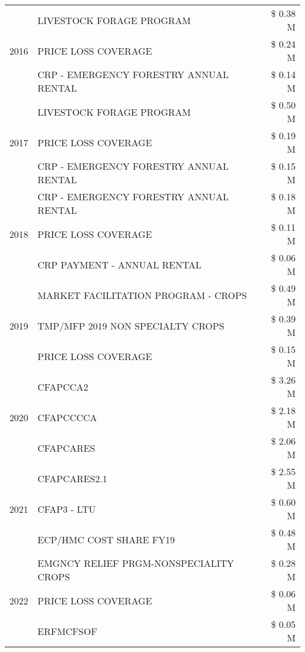 \begin{tabular}{llr}
\cline{1-3}
\multirow[t]{3}{*}{2016} & LIVESTOCK FORAGE PROGRAM & \$ 0.38 M \\
 & PRICE LOSS COVERAGE & \$ 0.24 M \\
 & CRP - EMERGENCY FORESTRY ANNUAL RENTAL & \$ 0.14 M \\
\cline{1-3}
\multirow[t]{3}{*}{2017} & LIVESTOCK FORAGE PROGRAM & \$ 0.50 M \\
 & PRICE LOSS COVERAGE & \$ 0.19 M \\
 & CRP - EMERGENCY FORESTRY ANNUAL RENTAL & \$ 0.15 M \\
\cline{1-3}
\multirow[t]{3}{*}{2018} & CRP - EMERGENCY FORESTRY ANNUAL RENTAL & \$ 0.18 M \\
 & PRICE LOSS COVERAGE & \$ 0.11 M \\
 & CRP PAYMENT - ANNUAL RENTAL & \$ 0.06 M \\
\cline{1-3}
\multirow[t]{3}{*}{2019} & MARKET FACILITATION PROGRAM - CROPS & \$ 0.49 M \\
 & TMP/MFP 2019 NON SPECIALTY CROPS & \$ 0.39 M \\
 & PRICE LOSS COVERAGE & \$ 0.15 M \\
\cline{1-3}
\multirow[t]{3}{*}{2020} & CFAPCCA2 & \$ 3.26 M \\
 & CFAPCCCCA & \$ 2.18 M \\
 & CFAPCARES & \$ 2.06 M \\
\cline{1-3}
\multirow[t]{3}{*}{2021} & CFAPCARES2.1 & \$ 2.55 M \\
 & CFAP3 - LTU & \$ 0.60 M \\
 & ECP/HMC COST SHARE FY19 & \$ 0.48 M \\
\cline{1-3}
\multirow[t]{3}{*}{2022} & EMGNCY RELIEF PRGM-NONSPECIALITY CROPS & \$ 0.28 M \\
 & PRICE LOSS COVERAGE & \$ 0.06 M \\
 & ERFMCFSOF & \$ 0.05 M \\
\cline{1-3}
\bottomrule
\end{tabular}
